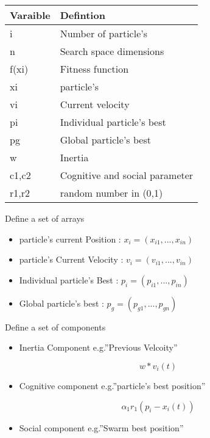 \documentclass[
]{article}
\providecommand{\tightlist}{%
  \setlength{\itemsep}{0pt}\setlength{\parskip}{0pt}}
\begin{document}
\begin{table}[H]
\centering\begingroup\fontsize{8}{10}\selectfont

\begin{tabular}{l|l}
\hline
Varaible & Defintion\\
\hline
i & Number of particle's\\
\hline
n & Search space dimensions\\
\hline
f(xi) & Fitness function\\
\hline
xi & particle's\\
\hline
vi & Current velocity\\
\hline
pi & Individual particle's best\\
\hline
pg & Global particle's best\\
\hline
w & Inertia\\
\hline
c1,c2 & Cognitive and social parameter\\
\hline
r1,r2 & random number in (0,1)\\
\hline
\end{tabular}
\endgroup{}
\end{table}

Define a set of arrays

\begin{itemize}
\tightlist
\item
  particle's current Position : \(x_i = (x_{i1},...,x_{in})\)
\item
  particle's Current Velocity : \(v_i = (v_{i1},...,v_{in})\)
\item
  Individual particle's Best : \(p_i = (p_{i1},...,p_{in})\)
\item
  Global particle's best : \(p_g = (p_{g1},...,p_{gn})\)
\end{itemize}

Define a set of components

\begin{itemize}
\tightlist
\item
  Inertia Component e.g.''Previous Velcoity''
\end{itemize}

\[
w * v_i(t)
\]

\begin{itemize}
\tightlist
\item
  Cognitive component e.g.''particle's best position''
\end{itemize}

\[
\alpha_1  r_1(p_i-x_i(t))
\]

\begin{itemize}
\tightlist
\item
  Social component e.g.''Swarm best position''
\end{itemize}
\end{document}
